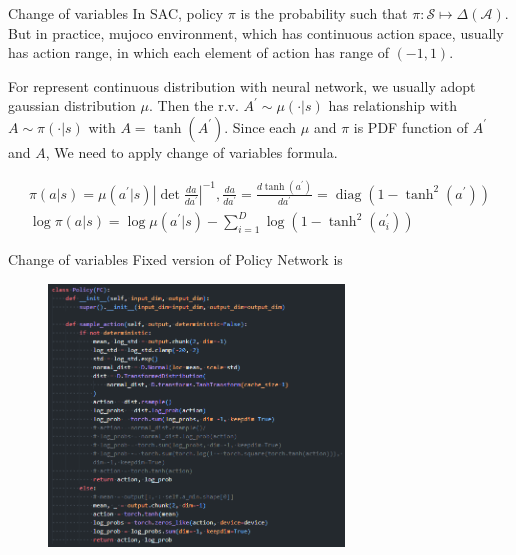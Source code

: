 \documentclass[8pt]{beamer}
\newcommand{\abs}[1]{\left\lvert #1 \right\rvert}
\begin{document}
\begin{frame}{Change of variables}
    In SAC, policy $\pi$ is the probability such that $\pi : \mathcal{S} \mapsto \Delta (\mathcal{A})$. But in practice, mujoco environment, which has continuous action space, usually has action range, in which each element of action has range of $(-1, 1)$.

    \bigskip
    For represent continuous distribution with neural network, we usually adopt gaussian distribution $\mu$. Then the r.v. $A^\prime \sim \mu(\cdot | s)$ has relationship with $A \sim \pi(\cdot | s)$ with $A = \tanh{(A^\prime)}$. Since each $\mu$ and $\pi$ is PDF function of $A^\prime$ and $A$, We need to apply change of variables formula.

    \bigskip
    \[
    \begin{gathered}
        \pi(a|s) = \mu(a^\prime | s) \abs{\operatorname{det} \frac{da}{da^\prime}}^{-1}, \frac{da}{da^\prime} = \frac{d\tanh{(a^\prime)}}{da^\prime} = \operatorname{diag}(1 - \operatorname{tanh}^2 (a^\prime)) \\
        \operatorname{log} \pi(a|s) = \operatorname{log} \mu(a^\prime |s) - \sum_{i=1}^D \log{(1 - \operatorname{tanh}^2 (a^\prime_i))}
    \end{gathered}
    \]
\end{frame}

\begin{frame}{Change of variables}
    Fixed version of Policy Network is
    \begin{figure}
        \centering
        \includegraphics[width=0.7\textwidth]{CoVPolicy.png}
    \end{figure}
\end{frame}
\end{document}
